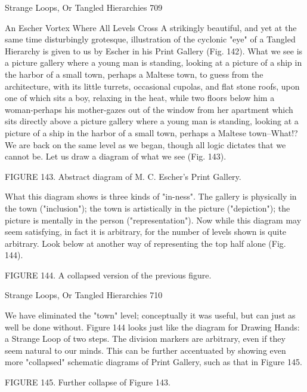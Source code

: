 Strange Loops, Or Tangled Hierarchies                                                      709

                   An Escher Vortex Where All Levels Cross
A strikingly beautiful, and yet at the same time disturbingly grotesque, illustration of the
cyclonic "eye" of a Tangled Hierarchy is given to us by Escher in his Print Gallery (Fig.
142). What we see is a picture gallery where a young man is standing, looking at a
picture of a ship in the harbor of a small town, perhaps a Maltese town, to guess from the
architecture, with its little turrets, occasional cupolas, and flat stone roofs, upon one of
which sits a boy, relaxing in the heat, while two floors below him a woman-perhaps his
mother-gazes out of the window from her apartment which sits directly above a picture
gallery where a young man is standing, looking at a picture of a ship in the harbor of a
small town, perhaps a Maltese town--What!? We are back on the same level as we began,
though all logic dictates that we cannot be. Let us draw a diagram of what we see (Fig.
143).




             FIGURE 143. Abstract diagram of M. C. Escher's Print Gallery.

What this diagram shows is three kinds of "in-ness". The gallery is physically in the town
("inclusion"); the town is artistically in the picture ("depiction"); the picture is mentally
in the person ("representation"). Now while this diagram may seem satisfying, in fact it is
arbitrary, for the number of levels shown is quite arbitrary. Look below at another way of
representing the top half alone (Fig. 144).




                FIGURE 144. A collapsed version of the previous figure.

Strange Loops, Or Tangled Hierarchies                                                    710

We have eliminated the "town" level; conceptually it was useful, but can just as well be
done without. Figure 144 looks just like the diagram for Drawing Hands: a Strange Loop
of two steps. The division markers are arbitrary, even if they seem natural to our minds.
This can be further accentuated by showing even more "collapsed" schematic diagrams of
Print Gallery, such as that in Figure 145.




                      FIGURE 145. Further collapse of Figure 143.

